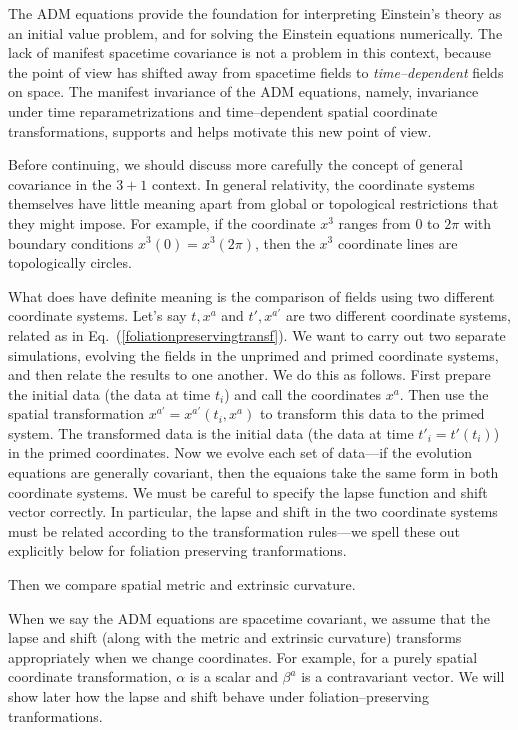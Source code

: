 \documentclass[letterpaper,nofootinbib,prd,amsmath,onecolumn]{revtex4-1}
\begin{document}
The ADM equations provide the foundation for interpreting Einstein's theory as an initial value problem, 
and for solving the Einstein equations numerically. 
The lack of manifest spacetime covariance is not a problem in this context, because the point of view has shifted away from 
spacetime fields to {\em time--dependent} fields on space. The manifest invariance of the ADM equations, namely, 
invariance under time reparametrizations and time--dependent 
spatial coordinate transformations, supports and helps motivate this new point of view. 

Before continuing, we should discuss more carefully the concept of general covariance in the $3+1$ context. 
In general relativity, the coordinate systems themselves have little meaning apart from 
global or topological restrictions that they might impose. For example, if the coordinate $x^3$ ranges from $0$ to $2\pi$ 
with boundary conditions $x^3(0) = x^3(2\pi)$, then the $x^3$ coordinate lines are topologically circles. 

What does have definite meaning is the comparison of fields using two different coordinate systems. Let's say $t,x^{a}$ and $t',x^{a'}$ are 
two different coordinate systems, related as in Eq.~(\ref{foliationpreservingtransf}). We want to carry out two separate simulations, 
evolving the fields in the unprimed and primed coordinate systems, and then relate the results to one another.  We do this as follows. 
First prepare the initial data (the data at time $t_i$) and call the coordinates $x^a$. Then use the spatial transformation 
$x^{a'} = x^{a'}(t_i,x^a)$ to transform this data to the primed system. The transformed data is the initial data (the data at time $t'_i = t'(t_i)$) 
in the primed coordinates. Now we evolve each set of data---if the evolution equations are generally covariant, then the equaions 
take the same form in both coordinate systems. We must be careful to specify the lapse function and shift vector correctly. In particular, 
the lapse and shift in the two coordinate systems must be related according to the transformation rules---we spell these out explicitly 
below for foliation preserving tranformations. 

Then we compare spatial metric and extrinsic curvature. 

When we say the ADM equations are spacetime covariant, we assume that the lapse and shift (along with the metric and extrinsic 
curvature) transforms appropriately when we change coordinates. For example, for a purely spatial coordinate transformation, $\alpha$ is a 
scalar and $\beta^a$ is a contravariant vector. We will show later how the lapse and shift behave under foliation--preserving 
tranformations. 
\end{document}
